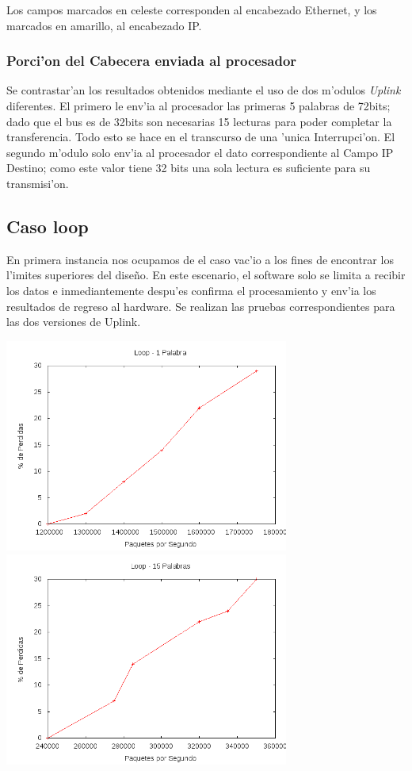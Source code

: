 \documentclass[12pt,spanish]{article}
\begin{document}
Los campos marcados en celeste corresponden al encabezado Ethernet, y los marcados en amarillo, al encabezado IP.

\subsubsection{Porci'on del  Cabecera enviada al procesador}

Se contrastar'an los resultados obtenidos mediante el uso de dos m'odulos \textit{Uplink} diferentes. El primero le env'ia al procesador las primeras 5 palabras de 72bits; dado que el bus es de 32bits son necesarias 15 lecturas para poder completar la transferencia. Todo esto se hace en el transcurso de una 'unica Interrupci'on. El segundo m'odulo solo env'ia al procesador el dato correspondiente al Campo IP Destino; como este valor tiene 32 bits una sola lectura es suficiente para su transmisi'on. 

\subsection{Caso loop}
En primera instancia nos ocupamos de el caso vac'io a los fines de encontrar los l'imites superiores del dise\~no.  En este escenario, el software solo se limita a recibir los datos e inmediantemente despu'es confirma el procesamiento y env'ia los resultados de regreso al hardware. Se realizan las pruebas correspondientes para las dos versiones de Uplink.

\begin{center}
	\includegraphics[width=0.70\textwidth]{graf/loop1p.png}
	\includegraphics[width=0.70\textwidth]{graf/loop15p.png}
\end{center}
\end{document}

